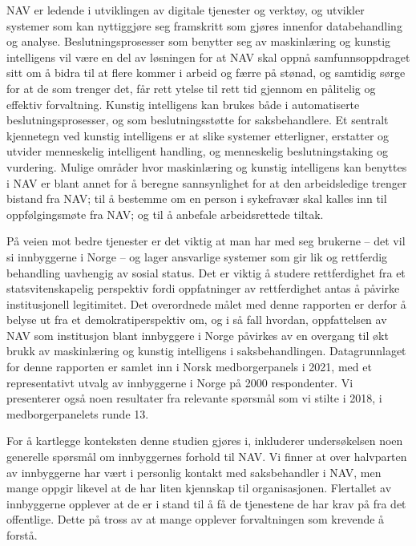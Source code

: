 \documentclass[
]{book}
\begin{document}
NAV er ledende i utviklingen av digitale tjenester og verktøy, og utvikler systemer som kan nyttiggjøre seg framskritt som gjøres innenfor databehandling og analyse.
Beslutningsprosesser som benytter seg av maskinlæring og kunstig intelligens vil være en del av løsningen for at NAV skal oppnå samfunnsoppdraget sitt om å bidra til at flere kommer i arbeid og færre på stønad, og samtidig sørge for at de som trenger det, får rett ytelse til rett tid gjennom en pålitelig og effektiv forvaltning.
Kunstig intelligens kan brukes både i automatiserte beslutningsprosesser, og som beslutningsstøtte for saksbehandlere.
Et sentralt kjennetegn ved kunstig intelligens er at slike systemer etterligner, erstatter og utvider menneskelig intelligent handling, og menneskelig beslutningstaking og vurdering.
Mulige områder hvor maskinlæring og kunstig intelligens kan benyttes i NAV er blant annet for å beregne sannsynlighet for at den arbeidsledige trenger bistand fra NAV; til å bestemme om en person i sykefravær skal kalles inn til oppfølgingsmøte fra NAV; og til å anbefale arbeidsrettede tiltak.

På veien mot bedre tjenester er det viktig at man har med seg brukerne -- det vil si innbyggerne i Norge -- og lager ansvarlige systemer som gir lik og rettferdig behandling uavhengig av sosial status.
Det er viktig å studere rettferdighet fra et statsvitenskapelig perspektiv fordi oppfatninger av rettferdighet antas å påvirke institusjonell legitimitet.
Det overordnede målet med denne rapporten er derfor å belyse ut fra et demokratiperspektiv om, og i så fall hvordan, oppfattelsen av NAV som institusjon blant innbyggere i Norge påvirkes av en overgang til økt brukk av maskinlæring og kunstig intelligens i saksbehandlingen.
Datagrunnlaget for denne rapporten er samlet inn i Norsk medborgerpanels i 2021, med et representativt utvalg av innbyggerne i Norge på 2000 respondenter.
Vi presenterer også noen resultater fra relevante spørsmål som vi stilte i 2018, i medborgerpanelets runde 13.

For å kartlegge konteksten denne studien gjøres i, inkluderer undersøkelsen noen generelle spørsmål om innbyggernes forhold til NAV.
Vi finner at over halvparten av innbyggerne har vært i personlig kontakt med saksbehandler i NAV, men mange oppgir likevel at de har liten kjennskap til organisasjonen.
Flertallet av innbyggerne opplever at de er i stand til å få de tjenestene de har krav på fra det offentlige.
Dette på tross av at mange opplever forvaltningen som krevende å forstå.
\end{document}
